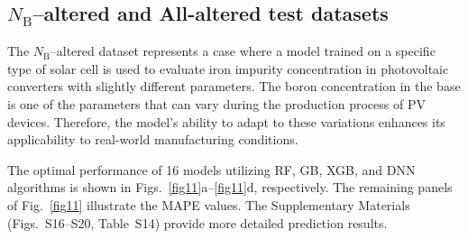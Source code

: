 \documentclass[a4paper,fleqn,draft]{cas-sc}
\begin{document}
\subsection{$N_\mathrm{B}$--altered and All-altered test datasets}\label{NBaltered}

The $N_\mathrm{B}$--altered dataset represents a case where a model trained on a specific type of solar cell is used to evaluate iron impurity concentration in photovoltaic converters with slightly different parameters. The boron concentration in the base is one of the parameters that can vary during the production process of PV devices. Therefore, the model's ability to adapt to these variations enhances its applicability to real-world manufacturing conditions.

The optimal performance of 16 models utilizing RF, GB, XGB, and DNN algorithms is shown in Figs.~\ref{fig11}a--\ref{fig11}d, respectively.
The remaining panels of Fig.~\ref{fig11} illustrate the MAPE values.
The Supplementary Materials (Figs.~S16--S20, Table~S14) provide more detailed prediction results.
\end{document}
